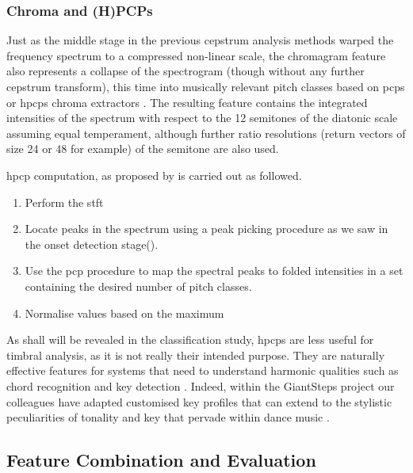 {{{{\subsubsection{Chroma and (H)PCPs}

Just as the middle stage in the previous cepstrum analysis methods warped the frequency spectrum to a compressed non-linear scale, the chromagram feature also represents a collapse of the spectrogram (though without any further cepstrum transform), this time into musically relevant pitch classes based on \acrfull{pcp}s \citep{Fujishima1999} or \acrfull{hpcp}s \citep{Gomez2004} chroma extractors \citep{Orio2006}. The resulting feature contains the integrated intensities of the spectrum with respect to the 12 semitones of the diatonic scale assuming equal temperament, although further ratio resolutions (return vectors of size 24 or 48 for example) of the semitone are also used.

\acrshort{hpcp} computation, as proposed by \cite{Gomez2006} is carried out as followed. 

\begin{enumerate}
  \item Perform the \acrshort{stft}
  \item Locate peaks in the spectrum using a peak picking procedure as we saw in the onset detection stage().
  \item Use the \acrshort{pcp} procedure to map the spectral peaks to folded intensities in a set containing the desired number of pitch classes.
  \item Normalise values based on the maximum
\end{enumerate}

As shall will be revealed in the classification study, \acrshort{hpcp}s are less useful for timbral analysis, as it is not really their intended purpose. They are naturally effective features for systems that need to understand harmonic qualities such as chord recognition \citep{Fujishima1999} and key detection \citep{Gomez2004}. Indeed, within the GiantSteps project our colleagues have adapted customised key profiles that can extend to the stylistic peculiarities of tonality and key that pervade within  dance music \citep{Faraldo2016, Faraldo2017, Faraldo2017b}.

\subsection{Feature Combination and Evaluation}

}}}}
